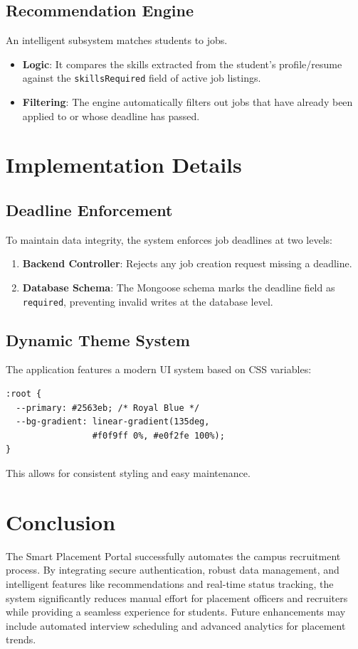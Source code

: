 \documentclass[conference]{IEEEtran}
\begin{document}
\subsection{Recommendation Engine}
An intelligent subsystem matches students to jobs.
\begin{itemize}
    \item \textbf{Logic}: It compares the skills extracted from the student's profile/resume against the \texttt{skillsRequired} field of active job listings.
    \item \textbf{Filtering}: The engine automatically filters out jobs that have already been applied to or whose deadline has passed.
\end{itemize}

\section{Implementation Details}

\subsection{Deadline Enforcement}
To maintain data integrity, the system enforces job deadlines at two levels:
\begin{enumerate}
    \item \textbf{Backend Controller}: Rejects any job creation request missing a deadline.
    \item \textbf{Database Schema}: The Mongoose schema marks the deadline field as \texttt{required}, preventing invalid writes at the database level.
\end{enumerate}

\subsection{Dynamic Theme System}
The application features a modern UI system based on CSS variables:
\begin{verbatim}
:root {
  --primary: #2563eb; /* Royal Blue */
  --bg-gradient: linear-gradient(135deg,
                 #f0f9ff 0%, #e0f2fe 100%);
}
\end{verbatim}
This allows for consistent styling and easy maintenance.

\section{Conclusion}
The Smart Placement Portal successfully automates the campus recruitment process. By integrating secure authentication, robust data management, and intelligent features like recommendations and real-time status tracking, the system significantly reduces manual effort for placement officers and recruiters while providing a seamless experience for students. Future enhancements may include automated interview scheduling and advanced analytics for placement trends.
\end{document}
